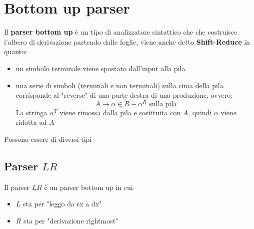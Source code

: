 \chapter{Bottom up parser}

Il \textbf{parser bottom up} è un tipo di analizzatore sintattico che che costruisce l'albero di derivazione partendo dalle foglie, viene anche detto \textbf{Shift-Reduce} in quanto:
\begin{itemize}
    \item un simbolo terminale viene spostato dall'input alla pila
    \item una serie di simboli (terminali e non terminali) sulla cima della pila corrisponde al "reverse" di una parte destra di una produzione, ovvero:
    \[
        A\to\alpha \in R - \alpha^R \text{ sulla pila}
    \]
    La stringa $\alpha^T$ viene rimossa dalla pila e sostituita con $A$, quindi $\alpha$ viene ridotta ad $A$
\end{itemize}
 
Possono essere di diversi tipi

\section{Parser $LR$}
Il parser $LR$ è un parser bottom up in cui
\begin{itemize}
    \item $L$ sta per "leggo da sx a dx"
    \item $R$ sta per "derivazione rightmost"
\end{itemize}

